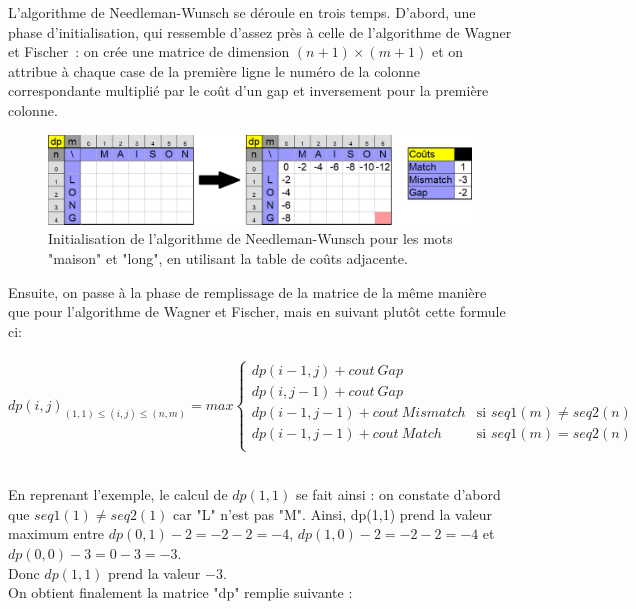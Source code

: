 \documentclass[12pt]{article}
\begin{document}
L'algorithme de Needleman-Wunsch se déroule en trois temps. D'abord, une phase d'initialisation, qui ressemble d'assez près à celle de l'algorithme de Wagner et Fischer~: on crée une matrice de dimension $(n+1)\times (m+1)$ et on attribue à chaque case de la première ligne le numéro de la colonne correspondante multiplié par le coût d'un gap et inversement pour la première colonne. \\

\begin{figure}[!h]
    \centering
    \includegraphics[scale = 0.55]{Images/Needleman/init needleman.png}
    \caption{Initialisation de l'algorithme de Needleman-Wunsch pour les mots "maison" et "long", en utilisant la table de coûts adjacente.}
    \label{fig:Matrice "dp" complète}
\end{figure}

Ensuite, on passe à la phase de remplissage de la matrice de la même manière que pour l'algorithme de Wagner et Fischer, mais en suivant plutôt cette formule ci: \\\\

$dp(i,j)_{(1,1)\leq (i,j)\leq (n,m)} = max\left\{
\begin{array}{ll}
dp(i-1,j)+cout\: Gap\\
dp(i,j-1)+cout\: Gap\\
dp(i-1,j-1) + cout\: Mismatch & \mbox{si } seq1(m)\neq seq2(n) \\
dp(i-1,j-1) + cout\: Match & \mbox{si } seq1(m) = seq2(n) \\
\end{array}
\right.$\\\\

\newpage

En reprenant l'exemple, le calcul de $dp(1,1)$ se fait ainsi : on constate d'abord que $seq1(1)\neq seq2(1)$ car "L" n'est pas "M". Ainsi, dp(1,1) prend la valeur maximum entre $dp(0,1)-2=-2-2=-4$, $dp(1,0)-2=-2-2=-4$ et $dp(0,0)-3=0-3=-3$.\\
Donc $dp(1,1)$ prend la valeur $-3$.\\

On obtient finalement la matrice "dp" remplie suivante :
\end{document}
